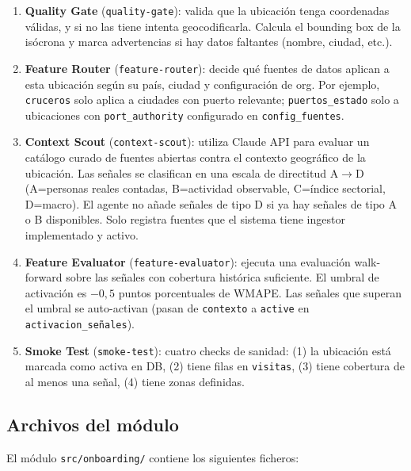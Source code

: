 \documentclass[12pt, a4paper]{article}
\begin{document}
\begin{enumerate}
  \item \textbf{Quality Gate} (\texttt{quality-gate}): valida que la ubicación tenga coordenadas válidas, y si no las tiene intenta geocodificarla. Calcula el bounding box de la isócrona y marca advertencias si hay datos faltantes (nombre, ciudad, etc.).

  \item \textbf{Feature Router} (\texttt{feature-router}): decide qué fuentes de datos aplican a esta ubicación según su país, ciudad y configuración de org. Por ejemplo, \texttt{cruceros} solo aplica a ciudades con puerto relevante; \texttt{puertos\_estado} solo a ubicaciones con \texttt{port\_authority} configurado en \texttt{config\_fuentes}.

  \item \textbf{Context Scout} (\texttt{context-scout}): utiliza Claude API para evaluar un catálogo curado de fuentes abiertas contra el contexto geográfico de la ubicación. Las señales se clasifican en una escala de directitud A$\rightarrow$D (A=personas reales contadas, B=actividad observable, C=índice sectorial, D=macro). El agente no añade señales de tipo D si ya hay señales de tipo A o B disponibles. Solo registra fuentes que el sistema tiene ingestor implementado y activo.

  \item \textbf{Feature Evaluator} (\texttt{feature-evaluator}): ejecuta una evaluación walk-forward sobre las señales con cobertura histórica suficiente. El umbral de activación es $-0{,}5$ puntos porcentuales de WMAPE. Las señales que superan el umbral se auto-activan (pasan de \texttt{contexto} a \texttt{active} en \texttt{activacion\_señales}).

  \item \textbf{Smoke Test} (\texttt{smoke-test}): cuatro checks de sanidad: (1) la ubicación está marcada como activa en DB, (2) tiene filas en \texttt{visitas}, (3) tiene cobertura de al menos una señal, (4) tiene zonas definidas.
\end{enumerate}

\subsection{Archivos del módulo}

El módulo \texttt{src/onboarding/} contiene los siguientes ficheros:
\end{document}
